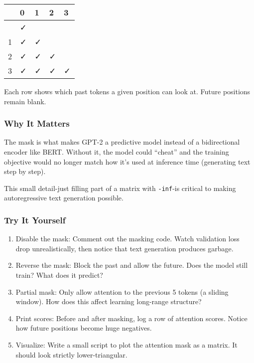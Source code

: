 \documentclass[
  letterpaper,
  DIV=11,
  numbers=noendperiod]{scrreprt}
\providecommand{\tightlist}{%
  \setlength{\itemsep}{0pt}\setlength{\parskip}{0pt}}
\begin{document}
\begin{longtable}[]{@{}lllll@{}}
\toprule\noalign{}
& 0 & 1 & 2 & 3 \\
\midrule\noalign{}
\endhead
\bottomrule\noalign{}
\endlastfoot
0 & ✓ & & & \\
1 & ✓ & ✓ & & \\
2 & ✓ & ✓ & ✓ & \\
3 & ✓ & ✓ & ✓ & ✓ \\
\end{longtable}

Each row shows which past tokens a given position can look at. Future
positions remain blank.

\subsubsection{Why It Matters}\label{why-it-matters-15}

The mask is what makes GPT-2 a predictive model instead of a
bidirectional encoder like BERT. Without it, the model could ``cheat''
and the training objective would no longer match how it's used at
inference time (generating text step by step).

This small detail-just filling part of a matrix with \texttt{-inf}-is
critical to making autoregressive text generation possible.

\subsubsection{Try It Yourself}\label{try-it-yourself-17}

\begin{enumerate}
\def\labelenumi{\arabic{enumi}.}
\tightlist
\item
  Disable the mask: Comment out the masking code. Watch validation loss
  drop unrealistically, then notice that text generation produces
  garbage.
\item
  Reverse the mask: Block the past and allow the future. Does the model
  still train? What does it predict?
\item
  Partial mask: Only allow attention to the previous 5 tokens (a sliding
  window). How does this affect learning long-range structure?
\item
  Print scores: Before and after masking, log a row of attention scores.
  Notice how future positions become huge negatives.
\item
  Visualize: Write a small script to plot the attention mask as a
  matrix. It should look strictly lower-triangular.
\end{enumerate}
\end{document}
